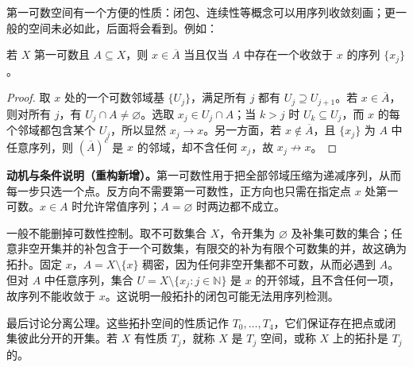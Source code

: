 \documentclass[../../main.tex]{subfiles}%
\begin{document}
第一可数空间有一个方便的性质：闭包、连续性等概念可以用序列收敛刻画；更一般的空间未必如此，后面将会看到。例如：
\begin{proposition}\label{proposition:ch04-sequential-closure}
若 $X$ 第一可数且 $A\subseteq X$，则 $x\in\overline A$ 当且仅当 $A$ 中存在一个收敛于 $x$ 的序列 $\{x_j\}$。
\end{proposition}
\begin{proof}
取 $x$ 处的一个可数邻域基 $\{U_j\}$，满足所有 $j$ 都有 $U_j\supseteq U_{j+1}$。若 $x\in\overline A$，则对所有 $j$，有 $U_j\cap A\ne\varnothing$。选取 $x_j\in U_j\cap A$；当 $k>j$ 时 $U_k\subseteq U_j$，而 $x$ 的每个邻域都包含某个 $U_j$，所以显然 $x_j\to x$。另一方面，若 $x\notin\overline A$，且 $\{x_j\}$ 为 $A$ 中任意序列，则 $(\overline A)^c$ 是 $x$ 的邻域，却不含任何 $x_j$，故 $x_j\not\to x$。
\end{proof}
\begin{remark}
\textbf{动机与条件说明（重构新增）。}第一可数性用于把全部邻域压缩为递减序列，从而每一步只选一个点。反方向不需要第一可数性，正方向也只需在指定点 $x$ 处第一可数。$x\in A$ 时允许常值序列；$A=\varnothing$ 时两边都不成立。

一般不能删掉可数性控制。取不可数集合 $X$，令开集为 $\varnothing$ 及补集可数的集合；任意非空开集并的补包含于一个可数集，有限交的补为有限个可数集的并，故这确为拓扑。固定 $x$，$A=X\setminus\{x\}$ 稠密，因为任何非空开集都不可数，从而必遇到 $A$。但对 $A$ 中任意序列，集合 $U=X\setminus\{x_j:j\in\mathbb N\}$ 是 $x$ 的开邻域，且不含任何一项，故序列不能收敛于 $x$。这说明一般拓扑的闭包可能无法用序列检测。
\end{remark}
最后讨论分离公理。这些拓扑空间的性质记作 $T_0,\ldots,T_4$，它们保证存在把点或闭集彼此分开的开集。若 $X$ 有性质 $T_j$，就称 $X$ 是 $T_j$ 空间，或称 $X$ 上的拓扑是 $T_j$ 的。
\end{document}
